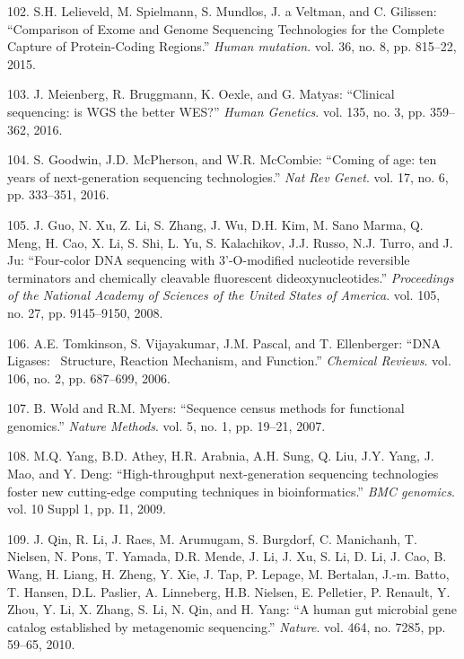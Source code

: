 \documentclass[12pt,twoside]{reedthesis}
\theoremstyle{definition}
\theoremstyle{definition}
\theoremstyle{remark}
\begin{document}
  \hypertarget{ref-Lelieveld2015}{}
  102. S.H. Lelieveld, M. Spielmann, S. Mundlos, J. a Veltman, and C.
  Gilissen: ``Comparison of Exome and Genome Sequencing Technologies for
  the Complete Capture of Protein-Coding Regions.'' \emph{Human mutation}.
  vol. 36, no. 8, pp. 815--22, 2015.
  
  \hypertarget{ref-Meienberg2016}{}
  103. J. Meienberg, R. Bruggmann, K. Oexle, and G. Matyas: ``Clinical
  sequencing: is WGS the better WES?'' \emph{Human Genetics}. vol. 135,
  no. 3, pp. 359--362, 2016.
  
  \hypertarget{ref-Goodwin2016}{}
  104. S. Goodwin, J.D. McPherson, and W.R. McCombie: ``Coming of age: ten
  years of next-generation sequencing technologies.'' \emph{Nat Rev
  Genet}. vol. 17, no. 6, pp. 333--351, 2016.
  
  \hypertarget{ref-Guo2008}{}
  105. J. Guo, N. Xu, Z. Li, S. Zhang, J. Wu, D.H. Kim, M. Sano Marma, Q.
  Meng, H. Cao, X. Li, S. Shi, L. Yu, S. Kalachikov, J.J. Russo, N.J.
  Turro, and J. Ju: ``Four-color DNA sequencing with 3'-O-modified
  nucleotide reversible terminators and chemically cleavable fluorescent
  dideoxynucleotides.'' \emph{Proceedings of the National Academy of
  Sciences of the United States of America}. vol. 105, no. 27, pp.
  9145--9150, 2008.
  
  \hypertarget{ref-Tomkinson2006}{}
  106. A.E. Tomkinson, S. Vijayakumar, J.M. Pascal, and T. Ellenberger:
  ``DNA Ligases:~ Structure, Reaction Mechanism, and Function.''
  \emph{Chemical Reviews}. vol. 106, no. 2, pp. 687--699, 2006.
  
  \hypertarget{ref-Wold2007}{}
  107. B. Wold and R.M. Myers: ``Sequence census methods for functional
  genomics.'' \emph{Nature Methods}. vol. 5, no. 1, pp. 19--21, 2007.
  
  \hypertarget{ref-Yang2009}{}
  108. M.Q. Yang, B.D. Athey, H.R. Arabnia, A.H. Sung, Q. Liu, J.Y. Yang,
  J. Mao, and Y. Deng: ``High-throughput next-generation sequencing
  technologies foster new cutting-edge computing techniques in
  bioinformatics.'' \emph{BMC genomics}. vol. 10 Suppl 1, pp. I1, 2009.
  
  \hypertarget{ref-Qin2010}{}
  109. J. Qin, R. Li, J. Raes, M. Arumugam, S. Burgdorf, C. Manichanh, T.
  Nielsen, N. Pons, T. Yamada, D.R. Mende, J. Li, J. Xu, S. Li, D. Li, J.
  Cao, B. Wang, H. Liang, H. Zheng, Y. Xie, J. Tap, P. Lepage, M.
  Bertalan, J.-m. Batto, T. Hansen, D.L. Paslier, A. Linneberg, H.B.
  Nielsen, E. Pelletier, P. Renault, Y. Zhou, Y. Li, X. Zhang, S. Li, N.
  Qin, and H. Yang: ``A human gut microbial gene catalog established by
  metagenomic sequencing.'' \emph{Nature}. vol. 464, no. 7285, pp. 59--65,
  2010.
  
\end{document}
